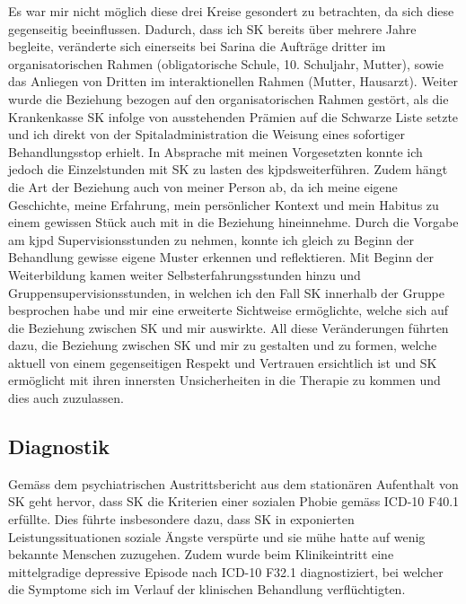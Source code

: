 Es war mir nicht möglich diese drei Kreise gesondert zu betrachten, da sich diese  gegenseitig beeinflussen. Dadurch, dass ich SK bereits über mehrere Jahre begleite, veränderte sich einerseits bei Sarina die Aufträge dritter im organisatorischen Rahmen (obligatorische Schule, 10. Schuljahr, Mutter), sowie das Anliegen von Dritten im interaktionellen Rahmen (Mutter, Hausarzt). Weiter wurde die Beziehung bezogen auf den organisatorischen Rahmen gestört, als die Krankenkasse SK infolge von ausstehenden Prämien auf die Schwarze Liste setzte und ich direkt von der Spitaladministration die Weisung eines sofortiger Behandlungsstop erhielt. In Absprache mit meinen Vorgesetzten konnte ich jedoch die Einzelstunden mit SK zu lasten des \acp{kjpd}weiterführen. Zudem hängt die Art der Beziehung auch von meiner Person ab, da ich meine eigene Geschichte, meine Erfahrung, mein persönlicher Kontext und mein Habitus zu einem gewissen Stück auch mit in die Beziehung hineinnehme. Durch die Vorgabe am \ac{kjpd} Supervisionsstunden zu nehmen, konnte ich gleich zu Beginn der Behandlung gewisse eigene Muster erkennen und reflektieren. Mit Beginn der Weiterbildung kamen weiter Selbsterfahrungsstunden hinzu und Gruppensupervisionsstunden, in welchen ich den Fall SK innerhalb der Gruppe besprochen habe und mir eine erweiterte Sichtweise ermöglichte, welche sich auf die Beziehung zwischen SK und mir auswirkte. All diese Veränderungen führten dazu, die Beziehung zwischen SK und mir zu gestalten und zu formen, welche aktuell von einem gegenseitigen Respekt und Vertrauen ersichtlich ist und SK ermöglicht mit ihren innersten Unsicherheiten in die Therapie zu kommen und dies auch zuzulassen. 

 
\subsection{Diagnostik} 
Gemäss dem psychiatrischen Austrittsbericht aus dem stationären Aufenthalt von SK geht hervor, dass SK die Kriterien einer sozialen Phobie gemäss ICD-10 F40.1 erfüllte. Dies führte insbesondere dazu, dass SK in exponierten Leistungssituationen soziale Ängste verspürte und sie mühe hatte auf wenig bekannte Menschen zuzugehen. Zudem wurde beim Klinikeintritt eine mittelgradige depressive Episode nach ICD-10 F32.1 diagnostiziert, bei welcher die Symptome sich im Verlauf der klinischen Behandlung verflüchtigten. 

